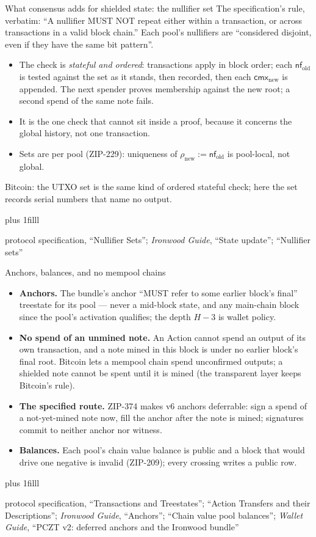 \documentclass[aspectratio=169,11pt]{beamer}
\newcommand{\nfsym}{\ensuremath{\mathsf{nf}}}
\newcommand{\cmx}{\ensuremath{\mathsf{cmx}}}
\newcommand{\src}[1]{\par\vskip0pt plus 1filll
  {\fontsize{6}{7.2}\selectfont\color{arbdim}\raggedright #1\par}}
\begin{document}
\begin{frame}{What consensus adds for shielded state: the nullifier set}
The specification's rule, verbatim: ``A nullifier MUST NOT repeat
either within a transaction, or across transactions in a valid block
chain.'' Each pool's nullifiers are ``considered disjoint, even if they
have the same bit pattern''.
\medskip
\begin{itemize}
\item The check is \emph{stateful and ordered}: transactions apply in
  block order; each $\nfsym_{\mathrm{old}}$ is tested against the set
  as it stands, then recorded, then each $\cmx_{\mathrm{new}}$ is
  appended. The next spender proves membership against the new root;
  a second spend of the same note fails.
\item It is the one check that cannot sit inside a proof, because it
  concerns the global history, not one transaction.
\item Sets are per pool (ZIP-229): uniqueness of $\rho_{\mathrm{new}}
  := \nfsym_{\mathrm{old}}$ is pool-local, not global.
\end{itemize}
\medskip
\alert{Bitcoin:} the UTXO set is the same kind of ordered stateful
check; here the set records serial numbers that name no output.
\src{protocol specification, ``Nullifier Sets''; \emph{Ironwood Guide},
  ``State update''; ``Nullifier sets''}
\end{frame}

\begin{frame}{Anchors, balances, and no mempool chains}
\begin{itemize}
\item \textbf{Anchors.} The bundle's anchor ``MUST refer to some
  earlier block's final'' treestate for its pool --- never a mid-block
  state, and any main-chain block since the pool's activation
  qualifies; the depth $H - 3$ is wallet policy.
\item \textbf{No spend of an unmined note.} An Action cannot spend an
  output of its own transaction, and a note mined in this block is
  under no earlier block's final root. \alert{Bitcoin} lets a mempool
  chain spend unconfirmed outputs; a shielded note cannot be spent
  until it is mined (the transparent layer keeps Bitcoin's rule).
\item \textbf{The specified route.} ZIP-374 makes v6 anchors
  deferrable: sign a spend of a not-yet-mined note now, fill the anchor
  after the note is mined; signatures commit to neither anchor nor
  witness.
\item \textbf{Balances.} Each pool's chain value balance is public and
  a block that would drive one negative is invalid (ZIP-209);
  every crossing writes a public row.
\end{itemize}
\src{protocol specification, ``Transactions and Treestates'';
  ``Action Transfers and their Descriptions''; \emph{Ironwood Guide},
  ``Anchors''; ``Chain value pool balances'';
  \emph{Wallet Guide}, ``PCZT v2: deferred anchors and the Ironwood
  bundle''}
\end{frame}
\end{document}
